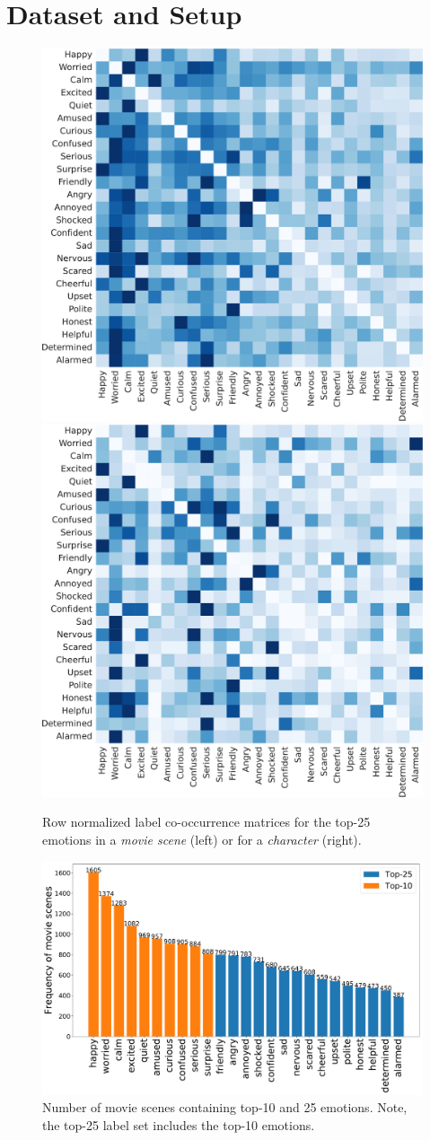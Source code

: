 \section{Dataset and Setup}
\label{sec:data}

\begin{figure}[t]
\centering
\includegraphics[width=0.48\linewidth]{Figures/scene_25.pdf}
\includegraphics[width=0.48\linewidth]{Figures/characters_25.pdf}
\vspace{-2mm}
\caption{Row normalized label co-occurrence matrices for the top-25 emotions in a \emph{movie scene} (left) or for a \emph{character} (right).}
\vspace{-4mm}
\label{fig:cooccurrence_maps}
\end{figure}

\begin{figure}[t]
\centering
\includegraphics[width=0.6\linewidth]{Figures/top_10_25_emo_freq.pdf}
\vspace{-2mm}
\caption{Number of movie scenes containing top-10 and 25 emotions. Note, the top-25 label set includes the top-10 emotions.}
\vspace{-5mm}
\label{fig:emotionFrequency}
\end{figure}

